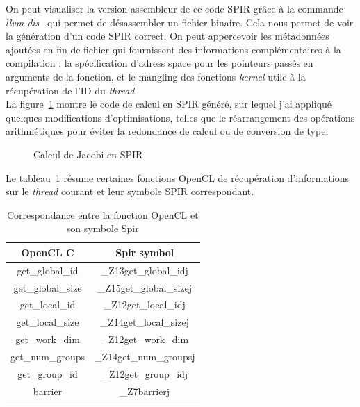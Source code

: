 On peut visualiser la version assembleur de ce code SPIR grâce à la commande
\emph{llvm-dis}~\cite{llvm_cmd} qui permet de désassembler un fichier binaire.
Cela nous permet de voir la génération d'un code SPIR correct. On peut
appercevoir les métadonnées ajoutées en fin de fichier qui fournissent des
informations complémentaires à la compilation ; la spécification d'adress space
pour les pointeurs passés en arguments de la fonction, et le mangling des
fonctions \emph{kernel} utile à la récupération de l'ID du \emph{thread}.\\
La figure~\ref{jacobi_calc_spir_kernel} montre le code de calcul en SPIR généré,
sur lequel j'ai appliqué quelques modifications d'optimisations, telles que le
réarrangement des opérations arithmétiques pour éviter la redondance de calcul
ou de conversion de type.

\clearpage
{}
\begin{figure}[h!]
   
   \caption{Calcul de Jacobi en SPIR}
   \label{jacobi_calc_spir_kernel}
\end{figure}
\clearpage

Le tableau~\ref{spir_mangling} résume certaines fonctions OpenCL de récupération
d'informations sur le \emph{thread} courant et leur symbole SPIR correspondant.

\begin{table}[h]
   \begin{center}
      \begin{tabular}{|c|c|}
         \hline
         OpenCL C & Spir symbol \\
         \hline
         get\_global\_id & \_Z13get\_global\_idj \\
         \hline
         get\_global\_size & \_Z15get\_global\_sizej \\
         \hline
         get\_local\_id & \_Z12get\_local\_idj \\
         \hline
         get\_local\_size & \_Z14get\_local\_sizej \\
         \hline
         get\_work\_dim & \_Z12get\_work\_dim \\
         \hline
         get\_num\_groups & \_Z14get\_num\_groupsj \\
         \hline
         get\_group\_id & \_Z12get\_group\_idj \\
         \hline
         barrier & \_Z7barrierj \\
         \hline
      \end{tabular}
   \end{center}
   \caption{Correspondance entre la fonction OpenCL et son symbole Spir}
   \label{spir_mangling}
\end{table}

